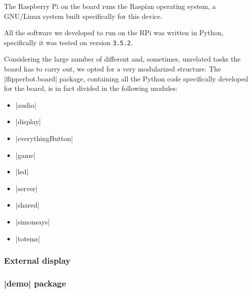 The Raspberry Pi on the board runs the Raspian operating system, a GNU/Linux
system built specifically for this device.

All the software we developed to run on the RPi was written in Python,
specifically it was tested on version \Verb|3.5.2|.

\beforelist* Considering the large number of different and, sometimes, unrelated
tasks the board has to carry out, we opted for a very modularized structure.
The \Code|flipperbot.board| package, containing all the Python code specifically
developed for the board, is in fact divided in the following modules:
\begin{itemize}
  \item \Code|audio|
  \item \Code|display|
  \item \Code|everythingButton|
  \item \Code|game|
  \item \Code|led|
  \item \Code|server|
  \item \Code|shared|
  \item \Code|simonsays|
  \item \Code|totems|
\end{itemize}
\afterlist


\subsubsection{External display}


\subsubsection[\code{demo} package]{\Code|demo| package}

